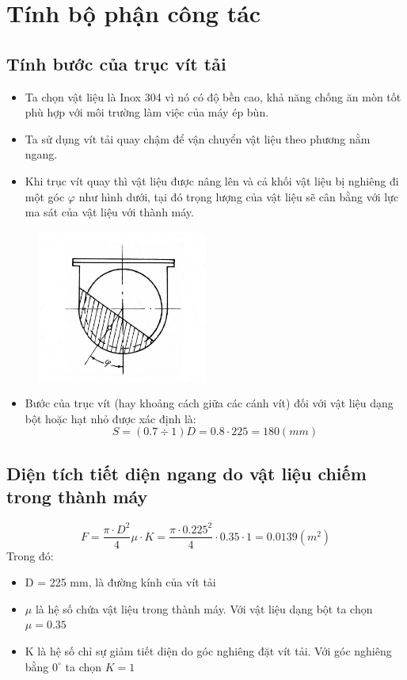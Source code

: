 \section{Tính bộ phận công tác}
\subsection{Tính bước của trục vít tải}
\begin{itemize}
    \item Ta chọn vật liệu là Inox 304 vì nó có độ bền cao, khả năng chống ăn mòn tốt phù hợp với môi trường làm việc của máy ép bùn.
    \item Ta sử dụng vít tải quay chậm để vận chuyển vật liệu theo phương nằm ngang. 
    \item Khi trục vít quay thì vật liệu được nâng lên và cả khối vật liệu bị nghiêng đi một góc $\varphi $ như hình dưới, tại đó trọng lượng của vật liệu sẽ cân bằng với lực ma sát của vật liệu với thành máy.
\end{itemize}
\begin{figure}[H]
    \centering
    \includegraphics[width=0.5\textwidth]{pictures/vittai1.png}
\end{figure}

\begin{itemize}
    \item Bước của trục vít (hay khoảng cách giữa các cánh vít) đối với vật liệu dạng bột hoặc hạt nhỏ được xác định là:
    \[
        S = (0.7 \div 1)D = 0.8 \cdot 225 = 180 (mm) 
    \]
\end{itemize}
\subsection{Diện tích tiết diện ngang do vật liệu chiếm trong thành máy}
\[
    F = \frac{\pi\cdot D^2}{4}\mu \cdot K = \frac{\pi\cdot 0.225^2}{4}\cdot 0.35\cdot 1 = 0.0139 (m^2)
\]
Trong đó: 
\begin{itemize}
    \item D = 225 mm, là đường kính của vít tải
    \item $\mu$ là hệ số chứa vật liệu trong thành máy. Với vật liệu dạng bột ta chọn $\mu = 0.35$
    \item K là hệ số chỉ sự giảm tiết diện do góc nghiêng đặt vít tải. Với góc nghiêng bằng $0^{\circ}$ ta chọn $K = 1$
\end{itemize}
